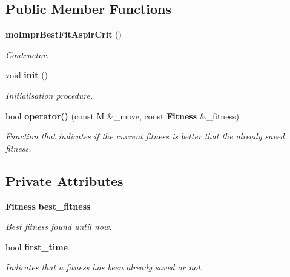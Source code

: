 \subsection*{Public Member Functions}
\begin{CompactItemize}
\item 
{\bf mo\-Impr\-Best\-Fit\-Aspir\-Crit} ()\label{classmo_impr_best_fit_aspir_crit_a0}

\begin{CompactList}\small\item\em Contructor. \item\end{CompactList}\item 
void {\bf init} ()\label{classmo_impr_best_fit_aspir_crit_a1}

\begin{CompactList}\small\item\em Initialisation procedure. \item\end{CompactList}\item 
bool {\bf operator()} (const M \&\_\-move, const {\bf Fitness} \&\_\-fitness)
\begin{CompactList}\small\item\em Function that indicates if the current fitness is better that the already saved fitness. \item\end{CompactList}\end{CompactItemize}
\subsection*{Private Attributes}
\begin{CompactItemize}
\item 
{\bf Fitness} {\bf best\_\-fitness}\label{classmo_impr_best_fit_aspir_crit_r0}

\begin{CompactList}\small\item\em Best fitness found until now. \item\end{CompactList}\item 
bool {\bf first\_\-time}\label{classmo_impr_best_fit_aspir_crit_r1}

\begin{CompactList}\small\item\em Indicates that a fitness has been already saved or not. \item\end{CompactList}\end{CompactItemize}


